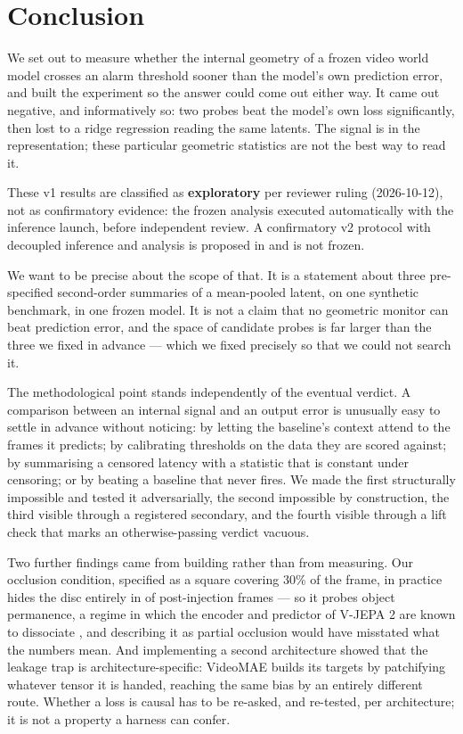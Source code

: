 \section{Conclusion}

We set out to measure whether the internal geometry of a frozen video world
model crosses an alarm threshold sooner than the model's own prediction error,
and built the experiment so the answer could come out either way. It came out
negative, and informatively so: two probes beat the model's own loss
significantly, then lost to a ridge regression reading the same latents. The
signal is in the representation; these particular geometric statistics are not
the best way to read it.

These v1 results are classified as \textbf{exploratory} per reviewer ruling
(2026-10-12), not as confirmatory evidence: the frozen analysis executed
automatically with the inference launch, before independent review. A
confirmatory v2 protocol with decoupled inference and analysis is proposed in
 and is not frozen.

We want to be precise about the scope of that. It is a statement about three
pre-specified second-order summaries of a mean-pooled latent, on one synthetic
benchmark, in one frozen model. It is not a claim that no geometric monitor can
beat prediction error, and the space of candidate probes is far larger than the
three we fixed in advance --- which we fixed precisely so that we could not
search it.

The methodological point stands independently of the eventual verdict. A
comparison between an internal signal and an output error is unusually easy to
settle in advance without noticing: by letting the baseline's context attend to
the frames it predicts; by calibrating thresholds on the data they are scored
against; by summarising a censored latency with a statistic that is constant
under censoring; or by beating a baseline that never fires. We made the first
structurally impossible and tested it adversarially, the second impossible by
construction, the third visible through a registered secondary, and the fourth
visible through a lift check that marks an otherwise-passing verdict vacuous.

Two further findings came from building rather than from measuring. Our
occlusion condition, specified as a square covering $30\%$ of the frame, in
practice hides the disc entirely in \lgwOccFullyHidden{} of post-injection
frames --- so it probes object permanence, a regime in which the encoder and
predictor of V-JEPA 2 are known to dissociate \citep{xie2026tracking}, and
describing it as partial occlusion would have misstated what the numbers mean.
And implementing a second architecture showed that the leakage trap is
architecture-specific: VideoMAE builds its targets by patchifying whatever
tensor it is handed, reaching the same bias by an entirely different route.
Whether a loss is causal has to be re-asked, and re-tested, per architecture; it
is not a property a harness can confer.

